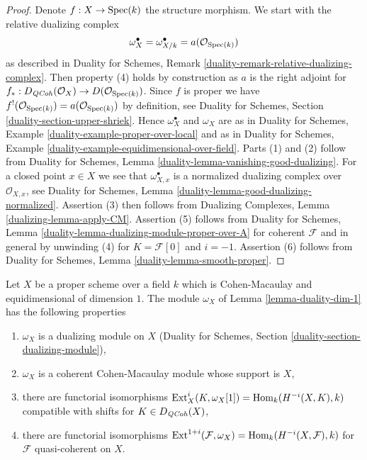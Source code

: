 \begin{proof}
Denote $f : X \to \mathop{\mathrm{Spec}}(k)$ the structure morphism.
We start with the relative dualizing complex
$$
\omega_X^\bullet = \omega_{X/k}^\bullet = a(\mathcal{O}_{\mathop{\mathrm{Spec}}(k)})
$$
as described in Duality for Schemes,
Remark \ref{duality-remark-relative-dualizing-complex}.
Then property (4) holds by construction as $a$ is the right
adjoint for $f_* : D_{\mathit{QCoh}}(\mathcal{O}_X) \to D(\mathcal{O}_{\mathop{\mathrm{Spec}}(k)})$.
Since $f$ is proper we have
$f^!(\mathcal{O}_{\mathop{\mathrm{Spec}}(k)}) = a(\mathcal{O}_{\mathop{\mathrm{Spec}}(k)})$ by
definition, see
Duality for Schemes, Section \ref{duality-section-upper-shriek}.
Hence $\omega_X^\bullet$ and $\omega_X$ are as in
Duality for Schemes, Example \ref{duality-example-proper-over-local}
and as in
Duality for Schemes, Example \ref{duality-example-equidimensional-over-field}.
Parts (1) and (2) follow from
Duality for Schemes, Lemma \ref{duality-lemma-vanishing-good-dualizing}.
For a closed point $x \in X$ we see that $\omega_{X, x}^\bullet$ is a
normalized dualizing complex over $\mathcal{O}_{X, x}$, see
Duality for Schemes, Lemma \ref{duality-lemma-good-dualizing-normalized}.
Assertion (3) then follows from
Dualizing Complexes, Lemma \ref{dualizing-lemma-apply-CM}.
Assertion (5) follows from
Duality for Schemes, Lemma \ref{duality-lemma-dualizing-module-proper-over-A}
for coherent $\mathcal{F}$ and in general by unwinding
(4) for $K = \mathcal{F}[0]$ and $i = -1$.
Assertion (6) follows from Duality for Schemes,
Lemma \ref{duality-lemma-smooth-proper}.
\end{proof}

\begin{lemma}
\label{lemma-duality-dim-1-CM}
Let $X$ be a proper scheme over a field $k$ which is Cohen-Macaulay
and equidimensional of dimension $1$. The module $\omega_X$
of Lemma \ref{lemma-duality-dim-1} has the following properties
\begin{enumerate}
\item $\omega_X$ is a dualizing module on $X$
(Duality for Schemes, Section \ref{duality-section-dualizing-module}),
\item $\omega_X$ is a coherent Cohen-Macaulay module whose support is $X$,
\item there are functorial isomorphisms
$\mathop{\mathrm{Ext}}\nolimits^i_X(K, \omega_X[1]) = \mathop{\mathrm{Hom}}\nolimits_k(H^{-i}(X, K), k)$
compatible with shifts for $K \in D_{\mathit{QCoh}}(X)$,
\item there are functorial isomorphisms
$\mathop{\mathrm{Ext}}\nolimits^{1 + i}(\mathcal{F}, \omega_X) = \mathop{\mathrm{Hom}}\nolimits_k(H^{-i}(X, \mathcal{F}), k)$
for $\mathcal{F}$ quasi-coherent on $X$.
\end{enumerate}
\end{lemma}

